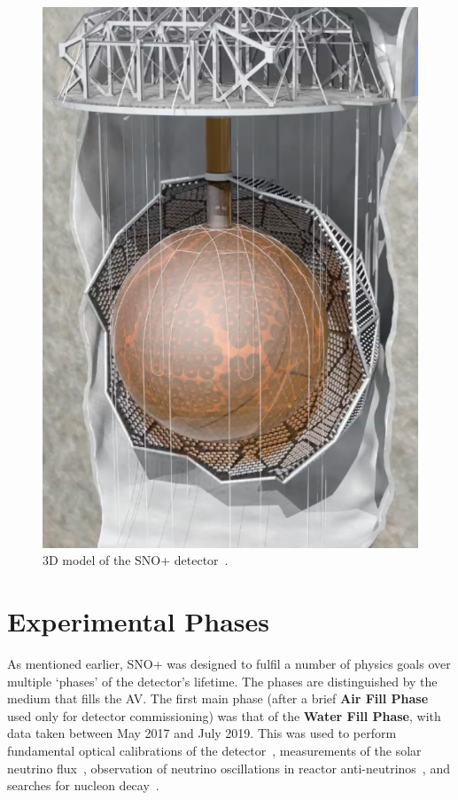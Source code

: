 \begin{figure}
    \centering
    \includegraphics[width=0.48\linewidth]{2_Detector/Figs/detector_picture.png}
    \caption[3D model of the SNO+ detector]{3D model of the SNO+ detector~\cite{albaneseSNOExperiment2021}.}
    \label{fig:snoplus_detector}
\end{figure}

\section{Experimental Phases}\label{sec:exp_phases}
As mentioned earlier, SNO+ was designed to fulfil a number of physics goals over multiple `phases' of the detector's lifetime. The phases are distinguished by the medium that fills the AV. The first main phase (after a brief \textbf{Air Fill Phase} used only for detector commissioning) was that of the \textbf{Water Fill Phase}, with data taken between May 2017 and July 2019. This was used to perform fundamental optical calibrations of the detector~\cite{andersonOpticalCalibrationSNO2021}, %
measurements of the solar neutrino flux~\cite{andersonMeasurementSolarNeutrino2019}, %
observation of neutrino oscillations in reactor anti-neutrinos~\cite{allegaEvidenceAntineutrinosDistant2023}, %
and searches for nucleon decay~\cite{andersonSearchInvisibleModes2019,allegaImprovedSearchInvisible2022}. %

